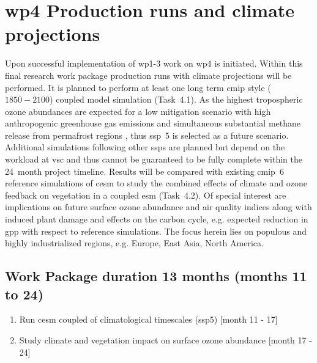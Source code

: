\section{\gls{wp}4 Production runs and climate projections}
\label{sec:wp4}
Upon successful implementation of \gls{wp}1-3 work on \gls{wp}4 is initiated. Within this final research work package production runs with climate projections will be performed. It is planned to perform at least one long term \gls{cmip} style ($1850-2100$) coupled model simulation (Task~4.1). As the highest tropospheric ozone abundances are expected for a low mitigation scenario with high anthropogenic greenhouse gas emissions and simultaneous substantial methane release from permafrost regions \parencites[e.g.][]{JGR:Rieder2015}{AE:Rieder2018}, thus \gls{ssp}~5 is selected as a future scenario. Additional simulations following other \glspl{ssp} are planned but depend on the workload at \gls{vsc} and thus cannot be guaranteed to be fully complete within the 24~month project timeline. Results will be compared with existing \gls{cmip}~6 reference simulations of \gls{cesm} to study the combined effects of climate and ozone feedback on vegetation in a coupled \gls{esm} (Task~4.2). Of special interest are implications on future surface ozone abundance and air quality indices along with induced plant damage and effects on the carbon cycle, e.g. expected reduction in \gls{gpp} with respect to reference simulations. The focus herein lies on populous and highly industrialized regions, e.g. Europe, East Asia, North America.

\subsection*{Work Package duration 13 months (months 11 to 24)}
\begin{enumerate}[start=1,label={T4.\arabic*}]
  \itemsep0pt
\item Run \gls{cesm} coupled of climatological timescales (\gls{ssp}5) \hfill [month 11 - 17]
\item Study climate and vegetation impact on surface ozone abundance \hfill [month 17 - 24]
\end{enumerate}

